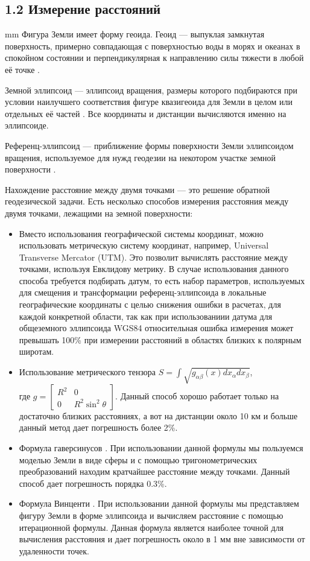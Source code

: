 \subsection*{\Large{1.2 Измерение расстояний}}
 mm
Фигура Земли имеет форму геоида. Геоид --- выпуклая замкнутая поверхность, примерно совпадающая с поверхностью воды в морях и океанах в спокойном состоянии и перпендикулярная к направлению силы тяжести в любой её точке \cite{Geoid}.
\par
Земной эллипсоид --- эллипсоид вращения, размеры которого подбираются при условии наилучшего соответствия фигуре квазигеоида для Земли в целом или отдельных её частей \cite{Ellipsoid}. Все координаты и дистанции вычисляются именно на эллипсоиде.
\par
Референц-эллипсоид --- приближение формы поверхности Земли эллипсоидом вращения, используемое для нужд геодезии на некотором участке земной поверхности \cite{RefEllipsoid}.
\par
Нахождение расстояние между двумя точками --- это решение обратной геодезической задачи. Есть несколько способов измерения расстояния между двумя точками, лежащими на земной поверхности:
\begin{itemize}
	\item Вместо использования географической системы координат, можно использовать метрическую систему координат, например, Universal Transverse Mercator (UTM). Это позволит вычислять расстояние между точками, используя Евклидову метрику. В случае использования данного способа требуется подбирать датум, то есть набор параметров, используемых для смещения и трансформации референц-эллипсоида в локальные географические координаты с целью снижения ошибки в расчетах, для каждой конкретной области, так как при использованиии датума для общеземного эллипсоида WGS84 относительная ошибка измерения может превышать 100\% при измерении расстояний в областях близких к полярным широтам.
	\item Использование метрического тензора $S = \int \sqrt{g_{\alpha\beta}(x) dx_\alpha dx_\beta}$,\\ где $g={\begin{bmatrix}R^{2}&0\\0&R^{2}\sin ^{2}\theta \end{bmatrix}}$. Данный способ хорошо работает только на достаточно близких расстояниях, а вот на дистанции около 10 км и больше данный метод дает погрешность более 2\%.
	\item Формула гаверсинусов \cite{Haversine}. При использовании данной формулы мы пользуемся моделью Земли в виде сферы и с помощью тригонометрических преобразований находим кратчайшее расстояние между точками. Данный способ дает погрешность порядка 0.3\%.
	\item Формула Винценти \cite{Vincenty}. При использовании данной формулы  мы представляем фигуру Земли в форме эллипсоида и вычисляем расстояние с помощью итерационной формулы. Данная формула является наиболее точной для вычисления расстояния и дает погрешность около в 1 мм вне зависимости от удаленности точек.
\end{itemize}

